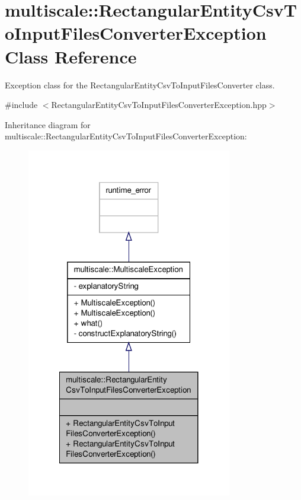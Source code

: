 \hypertarget{classmultiscale_1_1RectangularEntityCsvToInputFilesConverterException}{\section{multiscale\-:\-:Rectangular\-Entity\-Csv\-To\-Input\-Files\-Converter\-Exception Class Reference}
\label{classmultiscale_1_1RectangularEntityCsvToInputFilesConverterException}
}


Exception class for the Rectangular\-Entity\-Csv\-To\-Input\-Files\-Converter class.  




{\ttfamily \#include $<$Rectangular\-Entity\-Csv\-To\-Input\-Files\-Converter\-Exception.\-hpp$>$}



Inheritance diagram for multiscale\-:\-:Rectangular\-Entity\-Csv\-To\-Input\-Files\-Converter\-Exception\-:\nopagebreak
\begin{figure}[H]
\begin{center}
\leavevmode
\includegraphics[width=254pt]{classmultiscale_1_1RectangularEntityCsvToInputFilesConverterException__inherit__graph}
\end{center}
\end{figure}


